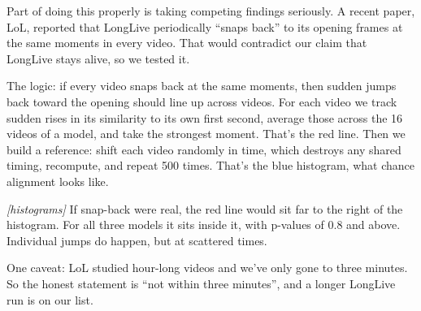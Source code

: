 \documentclass[11pt]{article}
\newcommand{\cue}[1]{{\small\color{gray}\textit{[#1]}}}
\begin{document}
Part of doing this properly is taking competing findings seriously. A recent paper, LoL, reported that LongLive periodically ``snaps back'' to its opening frames at the same moments in every video. That would contradict our claim that LongLive stays alive, so we tested it.

The logic: if every video snaps back at the same moments, then sudden jumps back toward the opening should line up across videos. For each video we track sudden rises in its similarity to its own first second, average those across the 16 videos of a model, and take the strongest moment. That's the red line. Then we build a reference: shift each video randomly in time, which destroys any shared timing, recompute, and repeat 500 times. That's the blue histogram, what chance alignment looks like.

\cue{histograms} If snap-back were real, the red line would sit far to the right of the histogram. For all three models it sits inside it, with p-values of 0.8 and above. Individual jumps do happen, but at scattered times.

One caveat: LoL studied hour-long videos and we've only gone to three minutes. So the honest statement is ``not within three minutes'', and a longer LongLive run is on our list.
\end{document}
